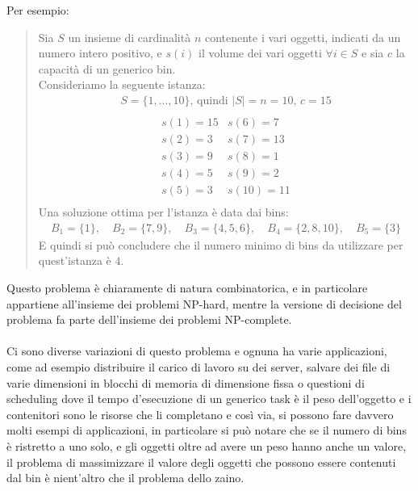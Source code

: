 \noindent
Per esempio:
\begin{quote}
	Sia $ S $ un insieme di cardinalità $ n $ contenente i vari oggetti, indicati da un numero intero positivo, e $ s(i) $
	il volume dei vari oggetti $ \forall i \in S $ e sia $ c $ la capacità di un generico bin. \\
	Consideriamo la seguente istanza:
	\begin{equation*}
		\begin{array}{c}
			S = \{1, ..., 10\} \text{, quindi } |S| = n = 10 \text{, } c = 15 \\
	    \end{array}
	\end{equation*}
	\begin{equation*}
	    \begin{array}{cc}
			s(1) = 15	&	s(6) = 7   \\
			s(2) = 3	&	s(7) = 13  \\
			s(3) = 9	&	s(8) = 1   \\
			s(4) = 5	&	s(9) = 2   \\
			s(5) = 3	&	s(10) = 11 \\
		\end{array}
	\end{equation*}
	Una soluzione ottima per l'istanza è data dai bins:
	\begin{align*}
		B_1 = \{1\} ,\quad B_2 = \{7, 9\} ,\quad B_3 = \{4, 5, 6\} ,\quad B_4 = \{2, 8, 10\} ,\quad B_5 = \{3\}
	\end{align*}
	E quindi si può concludere che il numero minimo di bins da utilizzare per quest'istanza è $ 4 $.
\end{quote}
Questo problema è chiaramente di natura combinatorica, e in particolare appartiene all'insieme dei problemi NP-hard, mentre
la versione di decisione del problema fa parte dell'insieme dei problemi NP-complete.\\ \\
Ci sono diverse variazioni di questo problema e ognuna ha varie applicazioni, come ad esempio distribuire il carico di
lavoro su dei server, salvare dei file di varie dimensioni in blocchi di memoria di dimensione fissa o questioni di
scheduling dove il tempo d'esecuzione di un generico task è il peso dell'oggetto e i contenitori sono le risorse che li
completano e così via, si possono fare davvero molti esempi di applicazioni, in particolare si può notare che se il numero
di bins è ristretto a uno solo, e gli oggetti oltre ad avere un peso hanno anche un valore, il problema di massimizzare il
valore degli oggetti che possono essere contenuti dal bin è nient'altro che il problema dello zaino.